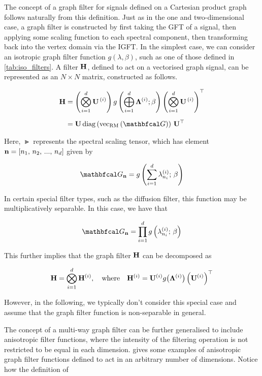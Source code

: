 The concept of a graph filter for signals defined on a Cartesian product graph follows naturally from this definition. Just as in the one and two-dimensional case, a graph filter is constructed by first taking the GFT of a signal, then applying some scaling function to each spectral component, then transforming back into the vertex domain via the IGFT. In the simplest case, we can consider an isotropic graph filter function $g(\lambda, \beta)$, such as one of those defined in \cref{tab:iso_filters}. A filter $\mathbf{H}$, defined to act on a vectorised graph signal, can be represented as an $N \times N$ matrix, constructed as follows. 


\begin{align}
    \label{eq:H_def_dd}
    \HH &= \left( \bigotimes_{i=1}^d  \U^{\,(i)} \right) g\left(\bigoplus_{i=1}^d \LAM^{(i)}; \beta \right) \left(\bigotimes_{i=1}^d  \U^{\,(i)} \right)^\top \notag \\[0.2cm]
        &= \U \, \diag{\vecrm{\Gt}} \, \U^\top
\end{align}


Here, $\Gt$ represents the spectral scaling tensor, which has element $\mathbf{n} = [n_1,\, n_2,\, ...,\, n_d]$ given by 

\begin{equation}
    \label{eq:Gn_dd1}
    \Gt_{\nn} = g\left(\sum_{i=1}^d \lambda^{(i)}_{n_i}; \, \beta\right)
\end{equation}

In certain special filter types, such as the diffusion filter, this function may be multiplicatively separable. In this case, we have that 

\begin{equation}
    \Gt_{\nn} = \prod_{i=1}^d g\left(\lambda^{(i)}_{n_i}; \, \beta\right)
\end{equation}

This further implies that the graph filter $\mathbf{H}$ can be decomposed as 

\begin{equation}
    \mathbf{H} = \bigotimes_{i=1}^d \mathbf{H}^{(i)}, \quad \text{where} \quad \mathbf{H}^{(i)} = \mathbf{U}^{(i)} g \big(\mathbf{\Lambda}^{(i)}\big) \left(\mathbf{U}^{(i)}\right)^\top
\end{equation}

However, in the following, we typically don't consider this special case and assume that the graph filter function is non-separable in general. 

The concept of a multi-way graph filter can be further generalised to include anisotropic filter functions, where the intensity of the filtering operation is not restricted to be equal in each dimension.  gives some examples of anisotropic graph filter functions defined to act in an arbitrary number of dimensions. Notice how the definition of  

